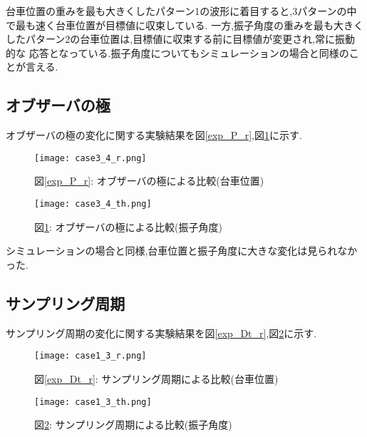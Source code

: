 台車位置の重みを最も大きくしたパターン1の波形に着目すると,3パターンの中で最も速く台車位置が目標値に収束している.
一方,振子角度の重みを最も大きくしたパターン2の台車位置は,目標値に収束する前に目標値が変更され,常に振動的な
応答となっている.振子角度についてもシミュレーションの場合と同様のことが言える.


\subsection{オブザーバの極}
オブザーバの極の変化に関する実験結果を図\ref{exp_P_r},図\ref{exp_P_th}に示す.

\begin{figure}[htbp]
    \begin{minipage}{0.5\hsize}
        \begin{center}
            \texttt{[image: case3\_4\_r.png]}
            \caption{図\ref{exp_P_r}: オブザーバの極による比較(台車位置)}
            \label{exp_P_r}
        \end{center}
    \end{minipage}
    \begin{minipage}{0.5\hsize}
        \begin{center}
            \texttt{[image: case3\_4\_th.png]}
            \caption{図\ref{exp_P_th}: オブザーバの極による比較(振子角度)}
            \label{exp_P_th}
        \end{center}
    \end{minipage}
\end{figure}

シミュレーションの場合と同様,台車位置と振子角度に大きな変化は見られなかった.


\subsection{サンプリング周期}
サンプリング周期の変化に関する実験結果を図\ref{exp_Dt_r},図\ref{exp_Dt_th}に示す.

\begin{figure}[htbp]
    \begin{minipage}{0.5\hsize}
        \begin{center}
            \texttt{[image: case1\_3\_r.png]}
            \caption{図\ref{exp_Dt_r}: サンプリング周期による比較(台車位置)}
            \label{exp_Dt_r}
        \end{center}
    \end{minipage}
    \begin{minipage}{0.5\hsize}
        \begin{center}
            \texttt{[image: case1\_3\_th.png]}
            \caption{図\ref{exp_Dt_th}: サンプリング周期による比較(振子角度)}
            \label{exp_Dt_th}
        \end{center}
    \end{minipage}
\end{figure}

